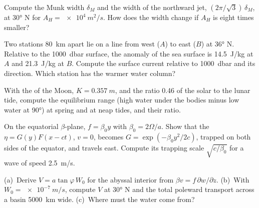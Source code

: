 \begin{exercise}[$\star\star$]\label{exo:b3:ocean-dynamics:7}
Compute the Munk width $\delta_M$ and the width of the northward jet,
$(2\pi/\sqrt3)\,\delta_M$, at \ang{30} N for $A_H = \qty{e4}{m^2/s}$. How
does the width change if $A_H$ is eight times smaller?
\end{exercise}

\begin{exercise}[$\star\star$]\label{exo:b3:ocean-dynamics:8}
Two stations \qty{80}{km} apart lie on a line from west ($A$) to east
($B$) at \ang{36} N. Relative to the \qty{1000}{dbar} surface, the
 anomaly of the sea surface is \qty{14.5}{J/kg} at $A$ and
\qty{21.3}{J/kg} at $B$. Compute the surface current relative to
\qty{1000}{dbar} and its direction. Which station has the warmer water
column?
\end{exercise}

\begin{exercise}[$\star\star$]\label{exo:b3:ocean-dynamics:9}
With the  of the Moon, $K = \qty{0.357}{m}$, and the ratio
\num{0.46} of the solar to the lunar tide, compute the equilibrium range
(high water under the bodies minus low water at \ang{90}) at spring and at
neap tides, and their ratio.
\end{exercise}

\begin{exercise}[$\star\star\star$]\label{exo:b3:ocean-dynamics:10}
On the equatorial $\beta$-plane, $f = \beta_0y$ with $\beta_0 =
2\Omega/a$. Show that the  $\eta = G(y)F(x - ct)$, $v = 0$,
becomes $G = \exp(-\beta_0y^2/2c)$, trapped on both sides of the equator,
and travels east. Compute its trapping scale $\sqrt{c/\beta_0}$ for a
wave of speed \qty{2.5}{m/s}.
\end{exercise}

\begin{exercise}[$\star\star\star$]\label{exo:b3:ocean-dynamics:11}
(a)~Derive $V = a\tan\varphi\,W_0$ for the abyssal interior from $\beta v =
f\,\partial w/\partial z$. (b)~With $W_0 = \qty{e-7}{m/s}$, compute $V$ at
\ang{30} N and the total poleward transport across a basin
\qty{5000}{km} wide. (c)~Where must the water come from?
\end{exercise}

